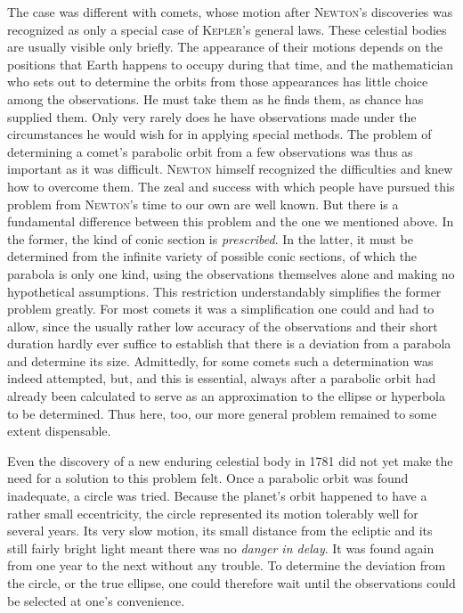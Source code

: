 The case was different with comets, whose motion after \textsc{Newton}’s discoveries was recognized as only a special case of \textsc{Kepler}’s general laws. These celestial bodies are usually visible only briefly. The appearance of their motions depends on the positions that Earth happens to occupy during that time, and the mathematician who sets out to determine the orbits from those appearances
has little choice among the observations. He must take them as he finds them, as chance has supplied them. Only very rarely does he have observations made under the circumstances he would wish for in applying special methods. The problem of determining a comet’s parabolic orbit from a few observations was thus as important as it was difficult. \textsc{Newton} himself recognized the difficulties and knew how to overcome them. The zeal and success with which people have pursued this problem from \textsc{Newton}’s time to our own are well known. But there is a fundamental difference between this problem and the one we mentioned above. In the former, the kind of conic section is \textit{prescribed}. In the latter, it must be determined from the infinite variety of possible conic sections, of which the parabola is only one kind, using the observations themselves alone and making no hypothetical assumptions. This restriction understandably simplifies the former problem greatly. For most comets it was a simplification one could and had to allow, since the usually rather low accuracy of the observations and their short duration hardly ever suffice to establish that there is a deviation from a parabola and determine its size. Admittedly, for some comets such a determination was indeed attempted, but, and this is essential, always after a parabolic orbit had already been calculated to serve as an approximation to the ellipse or hyperbola to be determined. Thus here, too, our more general problem remained to some extent dispensable.

Even the discovery of a new enduring celestial body in 1781 did not yet make the need for a solution to this problem felt. Once a parabolic orbit was found inadequate, a circle was tried. Because the planet’s orbit happened to have a rather small eccentricity, the circle represented its motion tolerably well for several years. Its very slow motion, its small distance from the ecliptic and its still fairly bright light meant there was no \textit{danger in delay}. It was found again from one year to the next without any trouble. To determine the deviation from the circle, or the true ellipse, one could therefore wait until the observations could be selected at one’s convenience.

